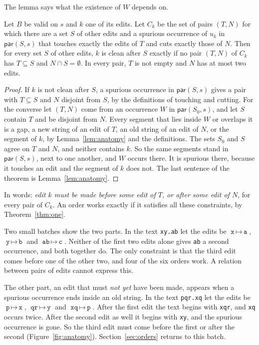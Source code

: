 \documentclass[acmsmall,nonacm,screen]{acmart}
\newcommand{\kw}[1]{\mathsf{#1}}
\newcommand{\edit}[2]{\texttt{#1}\,{\mapsto}\,\texttt{#2}}
\newcommand{\str}[1]{\texttt{#1}}
\newcommand{\Par}{\kw{par}}
\newcommand{\claim}[2]{#2}
\begin{document}
The lemma says what the existence of $W$ depends on.

\begin{theorem}[Constraints]\label{thm:constraints}
Let $B$ be valid on $s$ and $k$ one of its edits. Let $C_k$ be the set of pairs $(T, N)$ for
which there are a set $S$ of other edits and a spurious occurrence of $u_k$ in $\Par(S, s)$
that touches exactly the edits of $T$ and cuts exactly those of $N$. Then for every set $S$
of other edits, $k$ is clean after $S$ exactly if no pair $(T, N)$ of $C_k$ has $T \subseteq
S$ and $N \cap S = \emptyset$. In every pair, $T$ is not empty and $N$ has at most two edits.
\end{theorem}

\begin{proof}
If $k$ is not clean after $S$, a spurious occurrence in $\Par(S, s)$ gives a pair with $T
\subseteq S$ and $N$ disjoint from $S$, by the definitions of touching and cutting. For the
converse let $(T, N)$ come from an occurrence $W$ in $\Par(S_0, s)$, and let $S$ contain $T$
and be disjoint from $N$. Every segment that lies inside $W$ or overlaps it is a gap, a new
string of an edit of $T$, an old string of an edit of $N$, or the segment of $k$, by
Lemma~\ref{lem:anatomy} and the definitions. The sets $S_0$ and $S$ agree on $T$ and $N$, and
neither contains $k$. So the same segments stand in $\Par(S, s)$, next to one another, and
$W$ occurs there. It is spurious there, because it
touches an edit and the segment of $k$ does not. The last sentence of the theorem is
Lemma~\ref{lem:anatomy}.
\end{proof}

In words: \emph{edit $k$ must be made before some edit of $T$, or after some edit of $N$},
for every pair of $C_k$. An order works exactly if it satisfies all these constraints, by
Theorem~\ref{thm:one}.

Two small batches show the two parts. In the text \str{xy.ab} let the edits be $\edit{x}{a}$,
$\edit{y}{b}$ and $\edit{ab}{c}$. \claim{joint}{Neither of the first two edits alone gives
\str{ab} a second occurrence, and both together do. The only constraint is that the third
edit comes before one of the other two, and four of the six orders work.} A relation between
pairs of edits cannot express this.

The other part, an edit that must \emph{not yet} have been made, appears when a spurious
occurrence ends inside an old string. In the text \str{pqr.xq} let the edits be
$\edit{p}{x}$, $\edit{qr}{y}$ and $\edit{xq}{p}$. After the first edit the text begins with
\str{xqr}, and \str{xq} occurs twice. After the second edit as well it begins with \str{xy},
and the spurious occurrence is gone. So the third edit must come before the first or after
the second (Figure~\ref{fig:anatomy}). Section~\ref{sec:orders} returns to this batch.
\end{document}
